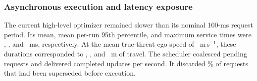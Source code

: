 \begin{table}[t]
\centering
\caption{Matched two-condition CARLA results over five randomized scene
blocks.  Incidence entries report episodes out of five.  Continuous entries
report the scene-block mean [descriptive 95\% bootstrap interval].  No
population-level significance inference is made.}
\label{tab:carla-two-condition}
\scriptsize
\setlength{\tabcolsep}{3pt}
\end{table}

\subsubsection{Asynchronous execution and latency exposure}
\label{sec:asynchronous-execution}

The current high-level optimizer remained slower than its nominal 100-ms
request period.  Its mean, mean per-run 95th percentile, and maximum service
times were \CarlaHighLevelMeanMs, \CarlaHighLevelPNinetyFiveMs, and
\CarlaHighLevelMaxMs~ms, respectively.  At the mean true-threat ego speed of
\CarlaThreatMeanSpeed~m\,s$^{-1}$, these durations corresponded to
\CarlaTravelAtMeanLatency, \CarlaTravelAtPNinetyFiveLatency, and
\CarlaTravelAtMaxLatency~m of travel.  The scheduler coalesced pending
requests and delivered \CarlaHighLevelRateHz{} completed updates per second.
It discarded \CarlaDroppedRequestsPct\% of requests that had been superseded
before execution.

